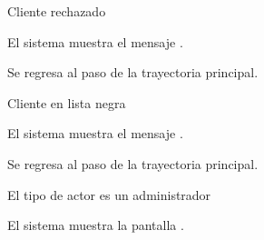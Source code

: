 {  \begin{trayectoriaAlternativa}
    {Cliente rechazado}

    \item El sistema muestra el mensaje
      .

    \item Se regresa al paso  de la trayectoria
      principal.

  \end{trayectoriaAlternativa}

  \begin{trayectoriaAlternativa}
    {Cliente en lista negra}

    \item El sistema muestra el mensaje
      .

    \item Se regresa al paso  de la trayectoria
      principal.

  \end{trayectoriaAlternativa}

  \begin{trayectoriaAlternativa}[ta:administrador]
    {El tipo de actor es un administrador}

    \item El sistema muestra la pantalla
      .

  \end{trayectoriaAlternativa}
}
